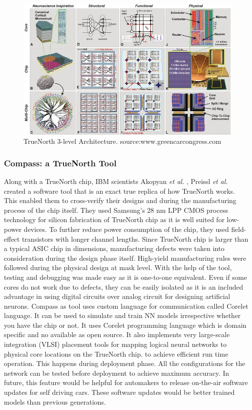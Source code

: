 \documentclass[11pt,twoside]{article}
\begin{document}
\begin{figure}
	\centering
	\includegraphics[width=1\linewidth]{Report-LateX-Template/fig/truenortharchitecture.png}
	\caption{TrueNorth 3-level Architecture. source:www.greencarcongress.com}
	\label{fig:tnarchi}
\end{figure}



\subsubsection{Compass: a TrueNorth Tool}
Along with a TrueNorth chip, IBM scientists Akopyan \textit{et al.} \cite{akopyan2015truenorth}, Preissl \textit{et al.} \cite{6468524} created a software tool that is an exact true replica of how TrueNorth works. This enabled them to cross-verify their designs and during the manufacturing process of the chip itself. They used Samsung’s 28 nm LPP CMOS process technology for silicon fabrication of TrueNorth chip as it is well suited for low-power devices. To further reduce power consumption of the chip, they used field-effect transistors with longer channel lengths. Since TrueNorth chip is larger than a typical ASIC chip in dimensions, manufacturing defects were taken into consideration during the design phase itself. High-yield manufacturing rules were followed during the physical design at mask level. With the help of the tool, testing and debugging was made easy as it is one-to-one equivalent. Even if some cores do not work due to defects, they can be easily isolated as it is an included advantage in using digital circuits over analog circuit for designing artificial neurons. 
Compass as tool uses custom language for communication called Corelet language. It can be used to simulate and train NN models irrespective whether you have the chip or not. It uses Corelet programming language which is domain specific and no available as open source. It also implements very large-scale integration (VLSI) placement tools for mapping logical neural networks to physical core locations on the TrueNorth chip. to achieve efficient run time operation. This happens during deployment phase. All the configurations for the network can be tested before deployment to achieve maximum accuracy. In future, this feature would be helpful for automakers to release on-the-air software updates for self driving cars. These software updates would be better trained models than previous generations. 
\end{document}
